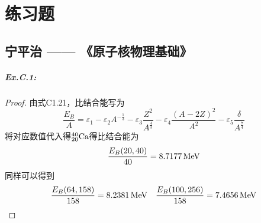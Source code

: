 \chapter{练习题}

\section{宁平治 —— 《原子核物理基础》}

\paragraph*{Ex.C.1:} 
\begin{proof}
    由式C1.21，比结合能写为
    \begin{equation}
        \frac{E_{B}}{A} =   \varepsilon_1 - \varepsilon_2 A^{-\frac{1}{3}}
                          - \varepsilon_3 \frac{Z^2}{A^{\frac{4}{3}}} 
                          - \varepsilon_4 \frac{(A - 2Z)^2}{A^2}
                          - \varepsilon_5 \frac{\delta}{A^{\frac{7}{4}}}
    \end{equation}
    将对应数值代入得$^{40}_{20}{\rm Ca}$得比结合能为
    \begin{equation*}
        \frac{E_{B}(20, 40)}{40} = 8.7177\, {\rm MeV}
    \end{equation*}
    同样可以得到
    \begin{equation*}
        \frac{E_{B}(64, 158)}{158} = 8.2381\, {\rm MeV}
        \quad
        \frac{E_{B}(100, 256)}{158} = 7.4656\, {\rm MeV}
    \end{equation*}
\end{proof}

